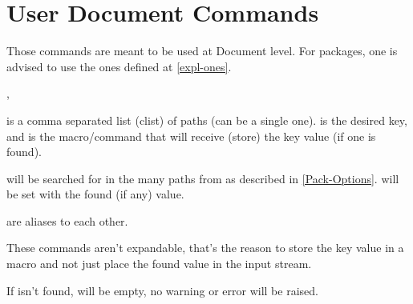 \documentclass[10pt]{article}
\begin{document}
\section{User Document Commands}\label{Doc-level}
Those commands are meant to be used at Document level. For packages, one is advised to use the ones defined at \ref{expl-ones}.

\begin{codedescribe}[code,update=2024/01/11]{\pgfkeysearchvalueof,\pgfkeysearch}
\begin{codesyntax}%
\end{codesyntax}
 is a comma separated list (clist) of paths (can be a single one).  is the desired key, and  is the macro/command that will receive (store) the key value (if one is found).

 will be searched for in the many paths from  as described in \ref{Pack-Options}.  will be set with the found (if any) value.
  
\end{codedescribe}
\begin{tsremark}
  \tsobj{\pgfkeysearch,\pgfkeysearchvalueof} are aliases to each other.
\end{tsremark}
\begin{tsremark}
  These commands aren't expandable, that's the reason to store the key value in a macro and not just place the found value in the input stream.
\end{tsremark}
\begin{tsremark}
  If  isn't found,  will be empty, no warning or error will be raised.
\end{tsremark}
\end{document}
